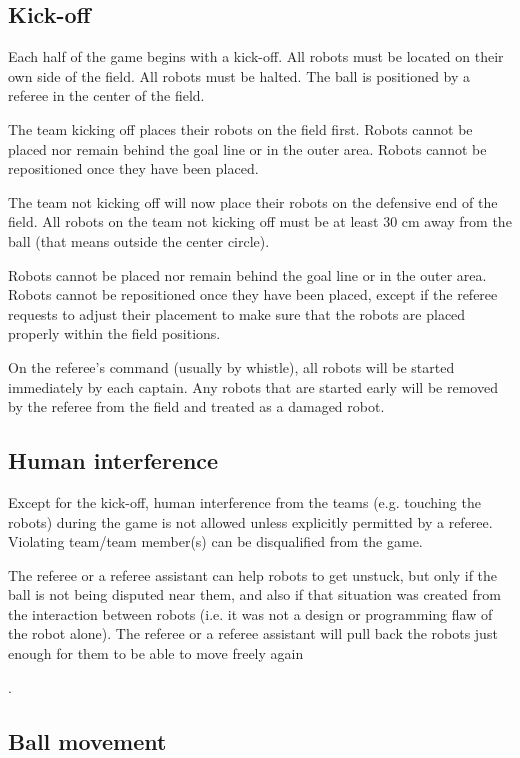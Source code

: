 \documentclass{article}
\begin{document}
\subsection{Kick-off \label{ref-004}}

Each half of the game begins with a kick-off. All robots must be located on their own side of the field. All robots must be halted. The ball is positioned by a referee in the center of the field. 

The team kicking off places their robots on the field first. Robots cannot be placed nor remain behind the goal line or in the outer area. Robots cannot be repositioned once they have been placed. 

The team not kicking off will now place their robots on the defensive end of the field. All robots on the team not kicking off must be at least 30 cm away from the ball (that means outside the center circle). 

Robots cannot be placed nor remain behind the goal line or in the outer area. Robots cannot be repositioned once they have been placed, except if the referee requests to adjust their placement to make sure that the robots are placed properly within the field positions. 

On the referee's command (usually by whistle), all robots will be started immediately by each captain. Any robots that are started early will be removed by the referee from the field and treated as a damaged robot. 

\subsection{Human interference\label{ref-005}}

Except for the kick-off, human interference from the teams (e.g. touching the robots) during the game is not allowed unless explicitly permitted by a referee. Violating team/team member(s) can be disqualified from the game. 

The referee or a referee assistant can help robots to get unstuck, but only if the ball is not being disputed near them, and also if that situation was created from the interaction between robots (i.e. it was not a design or programming flaw of the robot alone). The referee or a referee assistant will pull back the robots just enough for them to be able to move freely again

. 

\subsection{Ball movement \label{ref-006}}
\end{document}
